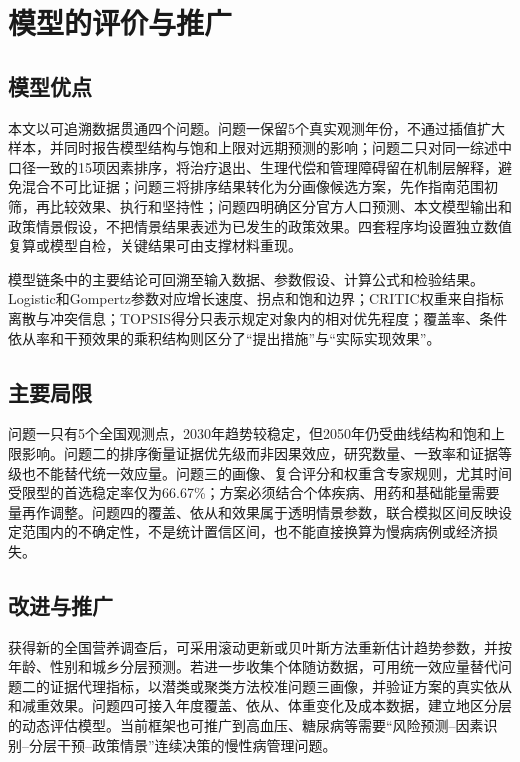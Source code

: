 \section{模型的评价与推广}

\subsection{模型优点}

本文以可追溯数据贯通四个问题。问题一保留5个真实观测年份，不通过插值扩大样本，并同时报告模型结构与饱和上限对远期预测的影响；问题二只对同一综述中口径一致的15项因素排序，将治疗退出、生理代偿和管理障碍留在机制层解释，避免混合不可比证据；问题三将排序结果转化为分画像候选方案，先作指南范围初筛，再比较效果、执行和坚持性；问题四明确区分官方人口预测、本文模型输出和政策情景假设，不把情景结果表述为已发生的政策效果。四套程序均设置独立数值复算或模型自检，关键结果可由支撑材料重现。

模型链条中的主要结论可回溯至输入数据、参数假设、计算公式和检验结果。Logistic和Gompertz参数对应增长速度、拐点和饱和边界；CRITIC权重来自指标离散与冲突信息；TOPSIS得分只表示规定对象内的相对优先程度；覆盖率、条件依从率和干预效果的乘积结构则区分了“提出措施”与“实际实现效果”。

\subsection{主要局限}

问题一只有5个全国观测点，2030年趋势较稳定，但2050年仍受曲线结构和饱和上限影响。问题二的排序衡量证据优先级而非因果效应，研究数量、一致率和证据等级也不能替代统一效应量。问题三的画像、复合评分和权重含专家规则，尤其时间受限型的首选稳定率仅为66.67\%；方案必须结合个体疾病、用药和基础能量需要量再作调整。问题四的覆盖、依从和效果属于透明情景参数，联合模拟区间反映设定范围内的不确定性，不是统计置信区间，也不能直接换算为慢病病例或经济损失。

\subsection{改进与推广}

获得新的全国营养调查后，可采用滚动更新或贝叶斯方法重新估计趋势参数，并按年龄、性别和城乡分层预测。若进一步收集个体随访数据，可用统一效应量替代问题二的证据代理指标，以潜类或聚类方法校准问题三画像，并验证方案的真实依从和减重效果。问题四可接入年度覆盖、依从、体重变化及成本数据，建立地区分层的动态评估模型。当前框架也可推广到高血压、糖尿病等需要“风险预测--因素识别--分层干预--政策情景”连续决策的慢性病管理问题。

